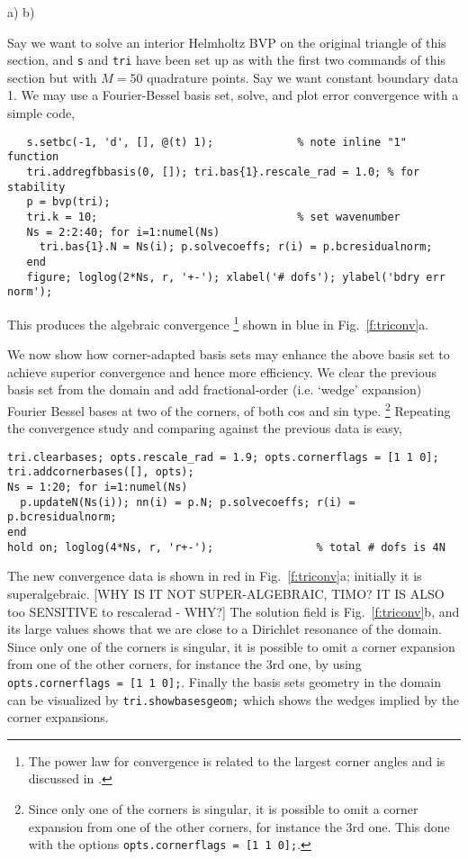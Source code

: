 \bfi %
a)
b)
\efi

Say we want to solve an interior Helmholtz BVP on the original triangle
of this section, and {\tt s} and {\tt tri} have been set up as with the
first two commands of this section but with $M=50$ quadrature points.
Say we want constant boundary data 1.
We may use a Fourier-Bessel basis set, solve, and
plot error convergence with a simple code,
\begin{verbatim}
   s.setbc(-1, 'd', [], @(t) 1);             % note inline "1" function
   tri.addregfbbasis(0, []); tri.bas{1}.rescale_rad = 1.0; % for stability
   p = bvp(tri);
   tri.k = 10;                               % set wavenumber
   Ns = 2:2:40; for i=1:numel(Ns)
     tri.bas{1}.N = Ns(i); p.solvecoeffs; r(i) = p.bcresidualnorm;
   end
   figure; loglog(2*Ns, r, '+-'); xlabel('# dofs'); ylabel('bdry err norm');
\end{verbatim}
This produces the algebraic convergence%
  \footnote{The power law for convergence is related to the largest corner
angles and is discussed in \cite{Ei74}.}
shown in blue in Fig.~\ref{f:triconv}a.

We now show how corner-adapted basis sets may enhance
the above basis set to achieve superior convergence and hence
more efficiency. We clear the previous basis set from the domain
and add fractional-order (i.e. `wedge' expansion) Fourier Bessel bases
at two of the corners, of both cos and sin type.%
  \footnote{Since only one of the corners is
    singular, it is possible to omit a corner
    expansion from one of the other corners, for instance the 3rd one.
    This done with the options {\tt opts.cornerflags = [1 1 0];}.}
Repeating the convergence
study and comparing against the previous data is easy,
\begin{verbatim}
tri.clearbases; opts.rescale_rad = 1.9; opts.cornerflags = [1 1 0];
tri.addcornerbases([], opts);
Ns = 1:20; for i=1:numel(Ns)
  p.updateN(Ns(i)); nn(i) = p.N; p.solvecoeffs; r(i) = p.bcresidualnorm;
end
hold on; loglog(4*Ns, r, 'r+-');                % total # dofs is 4N
\end{verbatim}
The new convergence data is shown in red in Fig.~\ref{f:triconv}a;
initially it is superalgebraic.
[WHY IS IT NOT SUPER-ALGEBRAIC, TIMO? IT IS ALSO too SENSITIVE to rescalerad - WHY?]
The solution field is Fig.~\ref{f:triconv}b, and its large values
shows that we are close to a Dirichlet resonance of the domain.
Since only one of the corners is singular, it is possible to omit a corner
expansion from one of the other corners, for instance the 3rd one, by
using {\tt opts.cornerflags = [1 1 0];}.
Finally the basis sets geometry in the domain can be visualized by
{\tt tri.showbasesgeom;} which shows the wedges implied by the corner
expansions.

